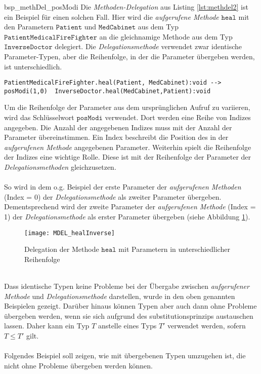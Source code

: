 \begin{example}{bsp_methDel_posModi}
Die \emph{Methoden-Delegation} aus Listing \ref{lst:methdel2} ist ein Beispiel für einen solchen Fall. Hier wird die \emph{aufgerufene Methode} $\texttt{heal}$ mit den Parametern $\texttt{Patient}$ und $\texttt{MedCabinet}$ aus dem Typ $\texttt{PatientMedicalFireFighter}$ an die gleichnamige Methode aus dem Typ $\texttt{InverseDoctor}$ delegiert. Die \emph{Delegationsmethode} verwendet zwar identische Parameter-Typen, aber die Reihenfolge, in der die Parameter übergeben werden, ist unterschiedlich.
\begin{lstlisting}[style = dsl, caption = Methoden-Delegation mit Parametern in unterschiedlicher Reihenfolge, captionpos = b]
	PatientMedicalFireFighter.heal(Patient, MedCabinet):void --> posModi(1,0)  InverseDoctor.heal(MedCabinet,Patient):void
\end{lstlisting}\label{lst:methdel2}
\end{example}
Um die Reihenfolge der Parameter aus dem ursprünglichen Aufruf zu variieren, wird das Schlüsselwort $\texttt{posModi}$ verwendet. Dort werden eine Reihe von Indizes angegeben. Die Anzahl der angegebenen Indizes muss mit der Anzahl der Parameter übereinstimmen. Ein Index beschreibt die Position des in der \emph{aufgerufenen Methode} angegebenen Parameter. Weiterhin spielt die Reihenfolge der Indizes eine wichtige Rolle. Diese ist mit der Reihenfolge der Parameter der \emph{Delegationsmethoden} gleichzusetzen.
\\\\
So wird in dem o.g. Beispiel der erste Parameter der \emph{aufgerufenen Methoden} (Index = 0) der \emph{Delegationsmethode} als zweiter Parameter übergeben. Dementsprechend wird der zweite Parameter der \emph{aufgerufenen Methode} (Index = 1) der \emph{Delegationsmethode} als erster Parameter übergeben (siehe Abbildung \ref{fig:DEL_healInverse}). 
\begin{figure}[H]
\centering
\texttt{[image: MDEL\_healInverse]}
\caption{Delegation der Methode $\texttt{heal}$ mit Parametern in unterschiedlicher Reihenfolge}
\label{fig:DEL_healInverse}
\end{figure}
\noindent
\\
Dass identische Typen keine Probleme bei der Übergabe zwischen \emph{aufgerufener Methode} und \emph{Delegationsmethode} darstellen, wurde in den oben genannten Beispielen gezeigt.
Darüber hinaus können Typen aber auch dann ohne Probleme übergeben werden, wenn sie sich aufgrund des \Gls{substitutionsprinzip}s austauschen lassen. Daher kann ein Typ $T$ anstelle eines Typs $T'$ verwendet werden, sofern $T \leq T'$ gilt.
\\\\
Folgendes Beispiel soll zeigen, wie mit übergebenen Typen umzugehen ist, die nicht ohne Probleme übergeben werden können.

